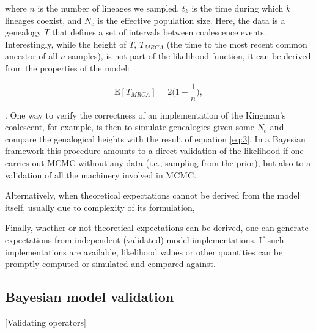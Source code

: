 \documentclass[oneside,twocolumn]{article}
\begin{document}
\noindent where $n$ is the number of lineages we sampled, $t_k$ is the time during which $k$ lineages
coexist, and $N_e$ is the effective population size.
Here, the data is a genealogy $T$ that defines a set of intervals
between coalescence events.
Interestingly, while the height of $T$, $T_{MRCA}$ (the time to the most
recent common ancestor of all $n$ samples), is not part of the
likelihood function, it can be derived from the properties of the
model:

\begin{equation}
  \text{E}[T_{MRCA}] = 2 \bigg(1-\frac{1}{n}\bigg),
  \label{eq:3}
\end{equation}

\noindent \citep{hudson90}.
One way to verify the correctness of an implementation of the Kingman's
coalescent, for example, is then to simulate genealogies given some
$N_e$ and compare the genalogical heights with the result of equation
\ref{eq:3}.
In a Bayesian framework this procedure amounts to a direct validation of the
likelihood if one carries out MCMC without any data (i.e., sampling
from the prior), but also to a validation of all the machinery involved in MCMC.

Alternatively, when theoretical expectations cannot be derived from
the model itself, usually due to complexity of its formulation, {\color{red}{[Place holder for Christiaan's text]}}

Finally, whether or not theoretical expectations can be
derived, one can generate expectations from independent (validated) model implementations.
If such implementations are available, likelihood values or other
quantities can be promptly computed or simulated and compared against.

\subsection*{Bayesian model validation}

[Validating operators]

\vspace{1cm}

\noindent [Coverage]
\end{document}
